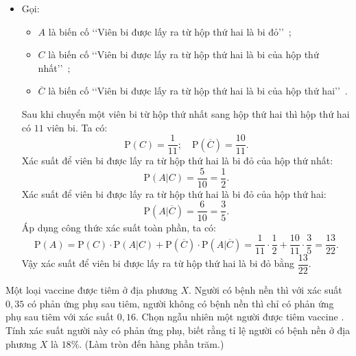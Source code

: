 \begin{ex}
{\begin{itemize}
\begin{itemchoice}
		Vậy xác suất để viên bi được lấy ra từ hộp thứ hai là bi đỏ bằng $\dfrac{13}{22}$.
		\end{itemchoice}
						\item[Cách 2] Gọi:
			\begin{itemize}
				\item $A$ là biến cố \lq \lq Viên bi được lấy ra từ hộp thứ hai là bi đỏ\rq \rq~;
				\item $C$ là biến cố \lq \lq Viên bi được lấy ra từ hộp thứ hai là bi của hộp thứ nhất\rq \rq~;
				\item $\overline{C}$ là biến cố \lq \lq Viên bi được lấy ra từ hộp thứ hai là bi của hộp thứ hai\rq \rq~.
			\end{itemize}
			Sau khi chuyển một viên bi từ hộp thứ nhất sang hộp thứ hai thì hộp thứ hai có $11$ viên bi. Ta có: 
			$$\mathrm{P}(C)=\dfrac{1}{11};\quad \mathrm{P}(\overline{C})=\dfrac{10}{11}.$$
			Xác suất để viên bi được lấy ra từ hộp thứ hai là bi đỏ của hộp thứ nhất: 
			$$\mathrm{P}(A|C)=\dfrac{5}{10}=\dfrac{1}{2}.$$
			Xác suất để viên bi được lấy ra từ hộp thứ hai là bi đỏ của hộp thứ hai: 
			$$\mathrm{P}(A|\overline{C})=\dfrac{6}{10}=\dfrac{3}{5}.$$
			Áp dụng công thức xác suất toàn phần, ta có:
			$$\mathrm{P}(A) = \mathrm{P}(C)\cdot \mathrm{P}(A|C) + \mathrm{P}(\overline{C})\cdot \mathrm{P}(A|\overline{C}) =\dfrac{1}{11}\cdot \dfrac{1}{2}+\dfrac{10}{11}\cdot \dfrac{3}{5}=\dfrac{13}{22}.$$
			Vậy xác suất để viên bi được lấy ra từ hộp thứ hai là bi đỏ bằng $\dfrac{13}{22}$.
		\end{itemize}
	}
\end{ex}

\begin{ex}%
	Một loại vaccine được tiêm ở địa phương $X$. Người có bệnh nền thì với xác suất $0{,}35$ có phản ứng phụ sau tiêm, người không có bệnh nền thì chỉ có phản ứng phụ sau tiêm với xác suất $0{,}16$. Chọn ngẫu nhiên một người được tiêm vaccine . Tính xác suất người này có phản ứng phụ, biết rằng tỉ lệ người có bệnh nền ở địa phương $X$ là $18\%$. (Làm  tròn đến hàng phần trăm.) 
\end{ex}

